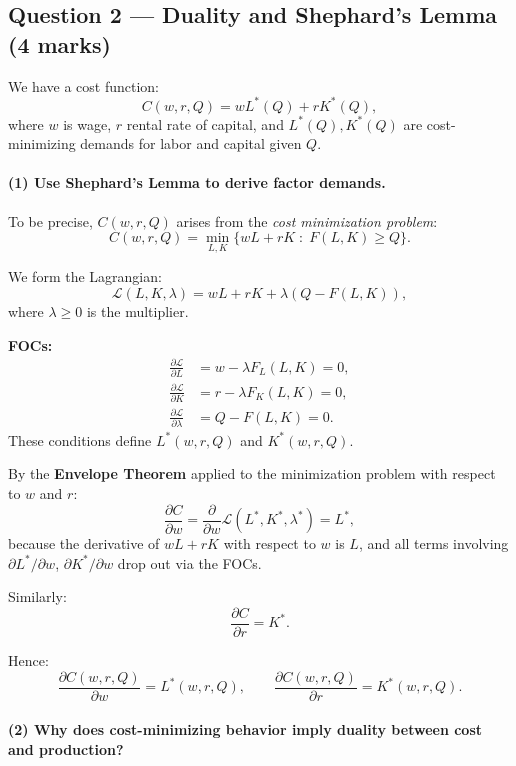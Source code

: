 \documentclass[12pt]{article}
\begin{document}
\subsection*{Question 2 — Duality and Shephard’s Lemma (4 marks)}

We have a cost function:
\[
C(w,r,Q) = wL^*(Q) + rK^*(Q),
\]
where $w$ is wage, $r$ rental rate of capital, and $L^*(Q),K^*(Q)$ are cost-minimizing demands for labor and capital given $Q$.

\paragraph{(1) Use Shephard’s Lemma to derive factor demands.}

To be precise, $C(w,r,Q)$ arises from the \emph{cost minimization problem}:
\[
C(w,r,Q) = \min_{L,K} \{ wL + rK \; : \; F(L,K) \ge Q \}.
\]

We form the Lagrangian:
\[
\mathcal{L}(L,K,\lambda) = wL + rK + \lambda(Q - F(L,K)),
\]
where $\lambda \ge 0$ is the multiplier.

\textbf{FOCs:}
\begin{align*}
\frac{\partial \mathcal{L}}{\partial L} &= w - \lambda F_L(L,K) = 0,\\
\frac{\partial \mathcal{L}}{\partial K} &= r - \lambda F_K(L,K) = 0,\\
\frac{\partial \mathcal{L}}{\partial \lambda} &= Q - F(L,K) = 0.
\end{align*}
These conditions define $L^*(w,r,Q)$ and $K^*(w,r,Q)$.

By the \textbf{Envelope Theorem} applied to the minimization problem with respect to $w$ and $r$:
\[
\frac{\partial C}{\partial w} = \frac{\partial}{\partial w} \mathcal{L}(L^*,K^*,\lambda^*)
= L^*,
\]
because the derivative of $wL + rK$ with respect to $w$ is $L$, and all terms involving $\partial L^*/\partial w$, $\partial K^*/\partial w$ drop out via the FOCs.

Similarly:
\[
\frac{\partial C}{\partial r} = K^*.
\]

Hence:
\[
\boxed{
\frac{\partial C(w,r,Q)}{\partial w} = L^*(w,r,Q), \qquad
\frac{\partial C(w,r,Q)}{\partial r} = K^*(w,r,Q).
}
\]

\paragraph{(2) Why does cost-minimizing behavior imply duality between cost and production?}
\end{document}
